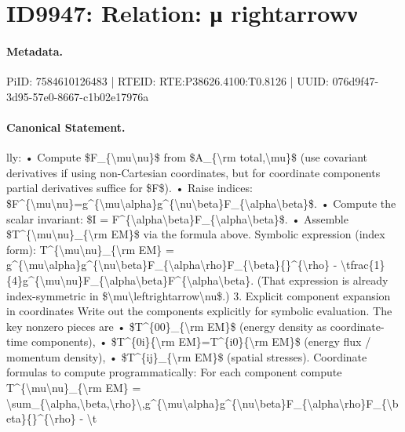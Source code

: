 \section*{ID9947: Relation: μ rightarrowν}
\paragraph{Metadata.}
PiID: 7584610126483 | RTEID: RTE:P38626.4100:T0.8126 | UUID: 076d9f47-3d95-57e0-8667-c1b02e17976a

\paragraph{Canonical Statement.}
lly: • Compute \$F\_\{\textbackslash{}mu\textbackslash{}nu\}\$ from \$A\_\{\textbackslash{}rm total,\textbackslash{}mu\}\$ (use covariant derivatives if using non-Cartesian coordinates, but for coordinate components partial derivatives suffice for \$F\$). • Raise indices: \$F\textasciicircum{}\{\textbackslash{}mu\textbackslash{}nu\}=g\textasciicircum{}\{\textbackslash{}mu\textbackslash{}alpha\}g\textasciicircum{}\{\textbackslash{}nu\textbackslash{}beta\}F\_\{\textbackslash{}alpha\textbackslash{}beta\}\$. • Compute the scalar invariant: \$I = F\textasciicircum{}\{\textbackslash{}alpha\textbackslash{}beta\}F\_\{\textbackslash{}alpha\textbackslash{}beta\}\$. • Assemble \$T\textasciicircum{}\{\textbackslash{}mu\textbackslash{}nu\}\_\{\textbackslash{}rm EM\}\$ via the formula above. Symbolic expression (index form): T\textasciicircum{}\{\textbackslash{}mu\textbackslash{}nu\}\_\{\textbackslash{}rm EM\} = g\textasciicircum{}\{\textbackslash{}mu\textbackslash{}alpha\}g\textasciicircum{}\{\textbackslash{}nu\textbackslash{}beta\}F\_\{\textbackslash{}alpha\textbackslash{}rho\}F\_\{\textbackslash{}beta\}\{\}\textasciicircum{}\{\textbackslash{}rho\} - \textbackslash{}tfrac\{1\}\{4\}g\textasciicircum{}\{\textbackslash{}mu\textbackslash{}nu\}F\_\{\textbackslash{}alpha\textbackslash{}beta\}F\textasciicircum{}\{\textbackslash{}alpha\textbackslash{}beta\}. (That expression is already index-symmetric in \$\textbackslash{}mu\textbackslash{}leftrightarrow\textbackslash{}nu\$.) 3. Explicit component expansion in coordinates Write out the components explicitly for symbolic evaluation. The key nonzero pieces are • \$T\textasciicircum{}\{00\}\_\{\textbackslash{}rm EM\}\$ (energy density as coordinate-time components), • \$T\textasciicircum{}\{0i\}\{\textbackslash{}rm EM\}=T\textasciicircum{}\{i0\}\{\textbackslash{}rm EM\}\$ (energy flux / momentum density), • \$T\textasciicircum{}\{ij\}\_\{\textbackslash{}rm EM\}\$ (spatial stresses). Coordinate formulas to compute programmatically: For each component compute T\textasciicircum{}\{\textbackslash{}mu\textbackslash{}nu\}\_\{\textbackslash{}rm EM\} = \textbackslash{}sum\_\{\textbackslash{}alpha,\textbackslash{}beta,\textbackslash{}rho\}\textbackslash{},g\textasciicircum{}\{\textbackslash{}mu\textbackslash{}alpha\}g\textasciicircum{}\{\textbackslash{}nu\textbackslash{}beta\}F\_\{\textbackslash{}alpha\textbackslash{}rho\}F\_\{\textbackslash{}beta\}\{\}\textasciicircum{}\{\textbackslash{}rho\} - \textbackslash{}t

